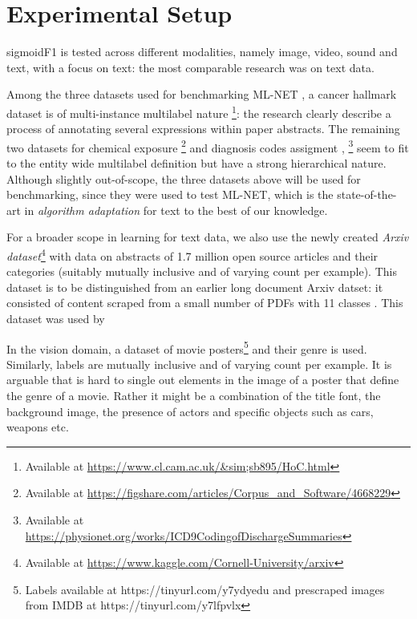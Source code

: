 
\section{Experimental Setup}
\label{sec:orgb44ba25}

sigmoidF1 is tested across different modalities, namely image, video, sound and text, with a focus on text: the most comparable research was on text data.



Among the three datasets used for benchmarking ML-NET \cite{multitaskLabel}, a cancer hallmark dataset is of multi-instance multilabel nature \cite{cancerHallmarks}\footnote{Available at \url{https://www.cl.cam.ac.uk/&sim;sb895/HoC.html}}: the research clearly describe a process of annotating several expressions within paper abstracts. The remaining two datasets for chemical exposure \cite{chemExposure}\footnote{Available at \url{https://figshare.com/articles/Corpus_and_Software/4668229}} and diagnosis codes assigment \cite{diagnosisCode}, \footnote{Available at \url{https://physionet.org/works/ICD9CodingofDischargeSummaries}} seem to fit to the entity wide multilabel definition but have a strong hierarchical nature. Although slightly out-of-scope, the three datasets above will be used for benchmarking, since they were used to test ML-NET, which is the state-of-the-art in \emph{algorithm adaptation} for text to the best of our knowledge.

For a broader scope in learning for text data, we also use the newly created \emph{Arxiv dataset}\footnote{Available at \url{https://www.kaggle.com/Cornell-University/arxiv}} with data on abstracts of 1.7 million open source articles and their categories (suitably mutually inclusive and of varying count per example). This dataset is to be distinguished from an earlier long document Arxiv datset: it consisted of content scraped from a small number of PDFs with 11 classes \cite{oldArxiv}. This dataset was used by \cite{}

In the vision domain, a dataset of movie posters\footnote{Labels available at https://tinyurl.com/y7ydyedu and prescraped images from IMDB at https://tinyurl.com/y7lfpvlx} and their genre is used. Similarly, labels are mutually inclusive and of varying count per example. It is arguable that is hard to single out elements in the image of a poster that define the genre of a movie. Rather it might be a combination of the title font, the background image, the presence of actors and specific objects such as cars, weapons etc. 


